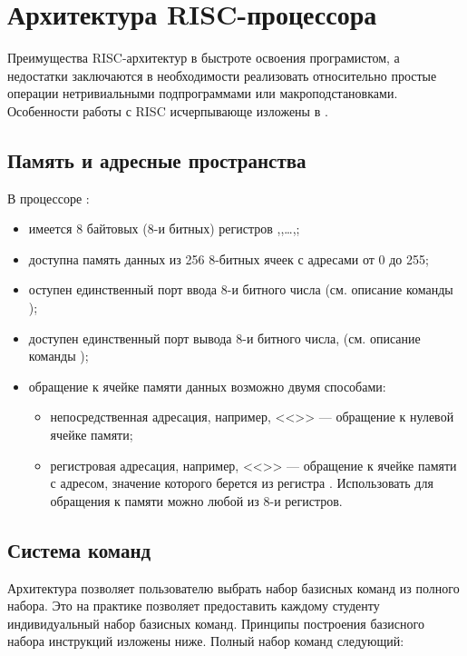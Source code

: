 \section{Архитектура RISC-процессора \MyProc}
\label{ch::risc}


Преимущества RISC-архитектур в быстроте освоения програмистом, а недостатки заключаются в необходимости реализовать относительно простые операции нетривиальными подпрограммами или макроподстановками. Особенности работы с RISC исчерпывающе изложены в \cite{bib:warren:algTriks}.

\subsection{Память и адресные пространства \MyProc}

В процессоре \MyProc:
\begin{itemize}
    \item имеется 8 байтовых (8-и битных) регистров ,,\ldots,;
    \item доступна память данных из 256 8-битных ячеек с адресами от 0 до 255;
    \item оступен единственный порт ввода 8-и битного числа (см. описание команды );
    \item доступен единственный порт вывода 8-и битного числа, (см. описание команды );
    \item обращение к ячейке памяти данных возможно двумя способами:
    \begin{itemize}
        \item непосредственная адресация, например, <<\Machine{[0]}>> --- обращение к нулевой ячейке памяти;
        \item регистровая адресация, например, <<\Machine{[r1]}>> --- обращение к ячейке памяти с адресом, значение которого берется из регистра . Использовать для обращения к памяти можно любой из 8-и регистров.
    \end{itemize}
\end{itemize}


\subsection{Система команд \MyProc}

Архитектура {\MyProc} позволяет пользователю выбрать набор базисных команд из полного набора. Это на практике позволяет предоставить каждому студенту индивидуальный набор базисных команд. Принципы построения базисного набора инструкций изложены ниже. Полный набор команд следующий:

